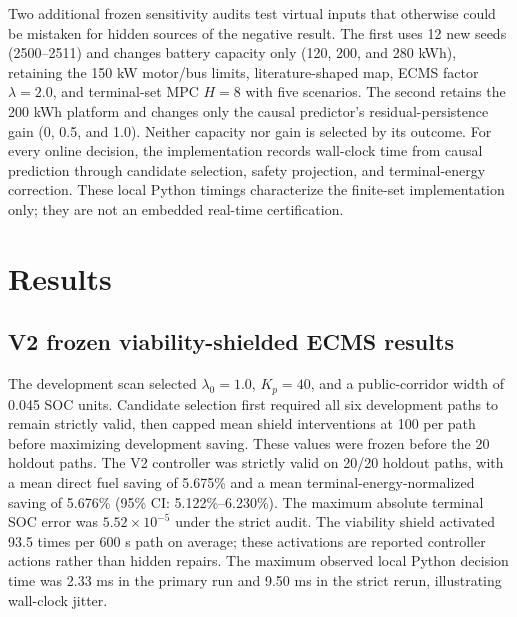 \documentclass[energies,article,submit,moreauthors]{Definitions/mdpi}
\begin{document}
Two additional frozen sensitivity audits test virtual inputs that otherwise could be mistaken for hidden sources of the negative result. The first uses 12 new seeds (2500--2511) and changes battery capacity only (120, 200, and 280 kWh), retaining the 150 kW motor/bus limits, literature-shaped map, ECMS factor $\lambda=2.0$, and terminal-set MPC $H=8$ with five scenarios. The second retains the 200 kWh platform and changes only the causal predictor's residual-persistence gain (0, 0.5, and 1.0). Neither capacity nor gain is selected by its outcome. For every online decision, the implementation records wall-clock time from causal prediction through candidate selection, safety projection, and terminal-energy correction. These local Python timings characterize the finite-set implementation only; they are not an embedded real-time certification.

\section{Results}
\subsection{V2 frozen viability-shielded ECMS results}
The development scan selected $\lambda_0=1.0$, $K_p=40$, and a public-corridor width of 0.045 SOC units. Candidate selection first required all six development paths to remain strictly valid, then capped mean shield interventions at 100 per path before maximizing development saving. These values were frozen before the 20 holdout paths. The V2 controller was strictly valid on 20/20 holdout paths, with a mean direct fuel saving of 5.675\% and a mean terminal-energy-normalized saving of 5.676\% (95\% CI: 5.122\%--6.230\%). The maximum absolute terminal SOC error was $5.52\times10^{-5}$ under the strict audit. The viability shield activated 93.5 times per 600 s path on average; these activations are reported controller actions rather than hidden repairs. The maximum observed local Python decision time was 2.33 ms in the primary run and 9.50 ms in the strict rerun, illustrating wall-clock jitter.

\begin{table}[H]
\centering
\caption{Frozen V2 holdout results on 20 new stochastic cycles. Values are paired with the same-seed load-following baseline.}
\label{tab:v2-main}
\scriptsize
{}
\end{table}
\end{document}
